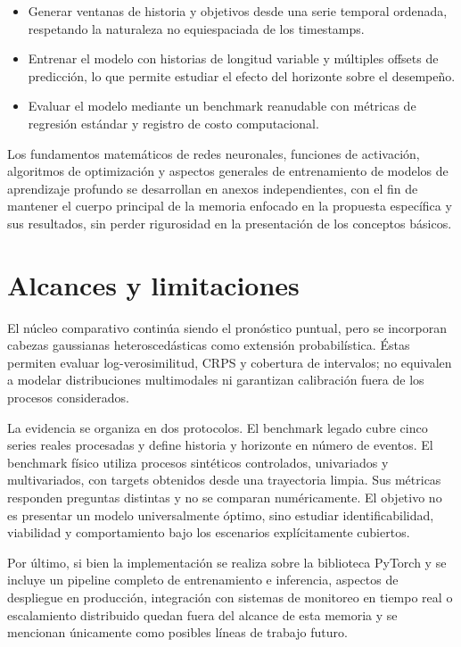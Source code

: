 \begin{itemize}
    \item Generar ventanas de historia y objetivos desde una serie temporal ordenada, respetando la naturaleza no equiespaciada de los timestamps.
    \item Entrenar el modelo con historias de longitud variable y múltiples offsets de predicción, lo que permite estudiar el efecto del horizonte sobre el desempeño.
    \item Evaluar el modelo mediante un benchmark reanudable con métricas de regresión estándar y registro de costo computacional.
\end{itemize}

Los fundamentos matemáticos de redes neuronales, funciones de activación, algoritmos de optimización y aspectos generales de entrenamiento de modelos de aprendizaje profundo se desarrollan en anexos independientes, con el fin de mantener el cuerpo principal de la memoria enfocado en la propuesta específica y sus resultados, sin perder rigurosidad en la presentación de los conceptos básicos.

\section{Alcances y limitaciones}

El núcleo comparativo continúa siendo el pronóstico puntual, pero se incorporan cabezas gaussianas heteroscedásticas como extensión probabilística. Éstas permiten evaluar log-verosimilitud, CRPS y cobertura de intervalos; no equivalen a modelar distribuciones multimodales ni garantizan calibración fuera de los procesos considerados.

\hfill

La evidencia se organiza en dos protocolos. El benchmark legado cubre cinco series reales procesadas y define historia y horizonte en número de eventos. El benchmark físico utiliza procesos sintéticos controlados, univariados y multivariados, con targets obtenidos desde una trayectoria limpia. Sus métricas responden preguntas distintas y no se comparan numéricamente. El objetivo no es presentar un modelo universalmente óptimo, sino estudiar identificabilidad, viabilidad y comportamiento bajo los escenarios explícitamente cubiertos.

Por último, si bien la implementación se realiza sobre la biblioteca PyTorch y se incluye un pipeline completo de entrenamiento e inferencia, aspectos de despliegue en producción, integración con sistemas de monitoreo en tiempo real o escalamiento distribuido quedan fuera del alcance de esta memoria y se mencionan únicamente como posibles líneas de trabajo futuro.


